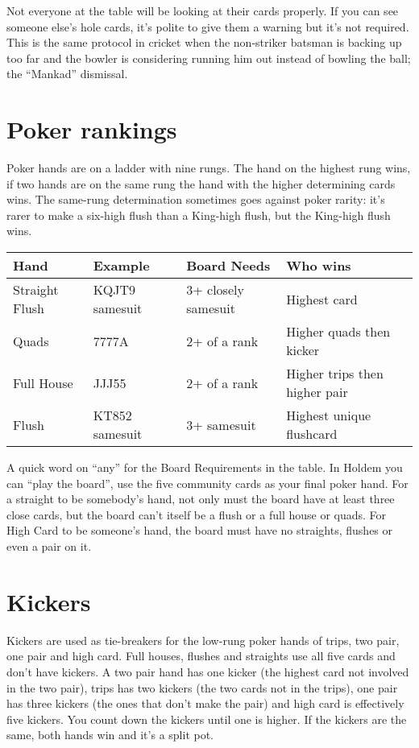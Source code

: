 Not everyone at the table will be looking at their cards properly. If
you can see someone else's hole cards, it's polite to give them a
warning but it's not required. This is the same protocol in cricket
when the non-striker batsman is backing up too far and the bowler is
considering running him out instead of bowling the ball; the
``Mankad'' dismissal.

\section{Poker rankings}

Poker hands are on a ladder with nine rungs. The hand on
the highest rung wins, if two hands are on the same rung the hand with
the higher determining cards wins. The same-rung determination
sometimes goes against poker rarity: it's rarer to make a six-high
flush than a King-high flush, but the King-high flush wins.

\begin{tabular}{|l|l|l|l|} \hline
Hand            & Example   & Board Needs       & Who wins \\ \hline
Straight Flush  & KQJT9 samesuit     & 3+ closely samesuit &
Highest card \\ \hline
Quads           & 7777A     & 2+ of a rank   & Higher quads then
kicker \\ \hline
Full House      & JJJ55     & 2+ of a rank   & Higher trips then
higher pair \\ \hline
Flush           & KT852 samesuit & 3+ samesuit & Highest unique
flushcard \\ \hline
\end{tabular}

A quick word on ``any'' for the Board Requirements in the table. In
Holdem you can ``play the board'', use the five community cards as
your final poker hand. For a straight to be somebody's hand, not only
must the board have at least three close cards, but the board can't
itself be a flush or a full house or quads. For High Card to be
someone's hand, the board must have no straights, flushes or even a pair
on it.

\section{Kickers}

Kickers are used as tie-breakers for the low-rung poker hands of
trips, two pair, one pair and high card. Full houses, flushes and
straights use all five cards and don't have kickers. A two pair hand
has one kicker (the highest card not involved in the two pair), trips
has two kickers (the two cards not in the trips), one pair has three
kickers (the ones that don't make the pair) and high card is
effectively five kickers. You count down the kickers until one is
higher. If the kickers are the same, both hands win and it's a split
pot.




